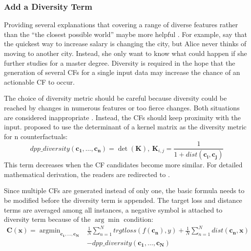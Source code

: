 \subsubsection{Add a Diversity Term}
Providing several explanations that covering a range of diverse features rather than the ``the closest possible world'' maybe more helpful \cite{watcher2017}. For example, say that the quickest way to increase salary is changing the city, but Alice never thinks of moving to another city. Instead, she only want to know what could happen if she further studies for a master degree. Diversity is required in the hope that the generation of several CFs for a single input data may increase the chance of an actionable CF to occur.

The choice of diversity metric should be careful because diversity could be reached by changes in numerous features or too fierce changes. Both situations are considered inappropriate \cite{DiCE}. Instead, the CFs should keep proximity with the input. \citeauthor{DiCE} \cite{DiCE} proposed to use the determinant of a kernel matrix as the diversity metric for n counterfactuals:
\begin{equation}\label{eq:dpp}
  dpp\_diversity(\mathbf{c_1,\dots,c_n})=\det(\mathbf{K}),\ \mathbf{K}_{i,j}=\frac{1}{1+dist(\mathbf{c_i,c_j})}
\end{equation}
%
This term decreases when the CF candidates become more similar. For detailed mathematical derivation, the readers are redirected to \cite[second chapter]{kulesza2011dpp}.

Since multiple CFs are generated instead of only one, the basic formula needs to be modified before the diversity term is appended. The target loss and distance terms are averaged among all instances, a negative symbol is attached to diversity term because of the $\arg\min$ condition:
\begin{equation}\label{eq:DiCe}
\begin{split}
  \mathbf{C(x)}=\mathop{\arg\min}_{\mathbf{c_1,\dots,c_N}}&\frac{1}{N}\sum_{n=1}^{N}trgtloss(f(\mathbf{c_n}),y)
  +\frac{1}{N}\sum_{n=1}^{N}dist(\mathbf{c_n,x})
  \\&-dpp\_diversity(\mathbf{c_1,\dots,c_N})
\end{split}
\end{equation}

